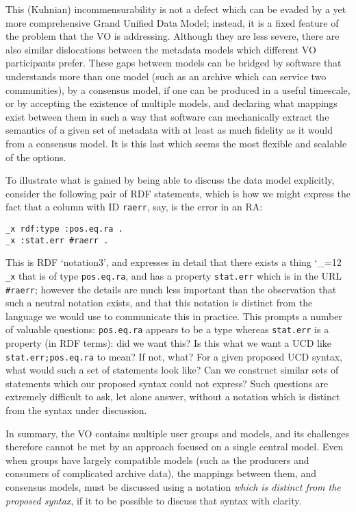 \documentclass[11pt,twoside]{article}
\begin{document}
This (Kuhnian) incommensurability is not a defect which can be evaded
by a yet more comprehensive Grand Unified Data Model; instead, it
is a fixed feature of the problem that the VO is addressing.  Although
they are less severe, there are also similar dislocations between the
metadata models which different VO participants prefer.  These gaps
between models can be bridged by software that understands more than
one model (such as an archive which can service two communities), by a
consensus model, if one can be produced in a useful timescale, or
by accepting the existence of multiple models, and declaring what
mappings exist between them in such a way that software can
mechanically extract the semantics of a given set of metadata with at
least as much fidelity as it would from a consensus model.  It is this
last which seems the most flexible and scalable of the options.

To illustrate what is gained by being able to discuss the data model
explicitly, consider the following pair of RDF statements, which is
how we might express the fact that a column with ID \texttt{raerr},
say, is the error in an RA:
\begin{verbatim}
_x rdf:type :pos.eq.ra .
_x :stat.err #raerr .
\end{verbatim}
This is RDF `notation3', and expresses in detail that there
exists a thing
{\catcode`\_=12 \texttt{_x}} %
that is of type \texttt{pos.eq.ra}, and
has a property \texttt{stat.err} which is in the URL
\texttt{\#raerr}; however the details are much less important than the
observation that such a neutral notation exists, and that this 
notation is distinct from the language we would use to communicate
this in practice.
%
This prompts a number of valuable questions: \texttt{pos.eq.ra}
appears to be a type whereas \texttt{stat.err} is a property (in RDF
terms): did we want this?  Is this what we want a UCD like
\texttt{stat.err;pos.eq.ra} to mean?  If not, what?  For a given
proposed UCD syntax, what would such a set of statements look like?
Can we construct similar sets of statements which our proposed syntax
could not express?  Such questions are extremely difficult to ask, let
alone answer, without a notation which is distinct from the
syntax under discussion.

In summary, the VO contains multiple user groups and models, 
and its challenges therefore cannot be met by an approach focused on a
single central model.  Even when groups have largely compatible models
(such as the producers and consumers of complicated archive data), the
mappings between them, and consensus models, must be discussed using a
notation \emph{which is distinct from the proposed syntax}, if it to
be possible to discuss that syntax with clarity.
\end{document}
